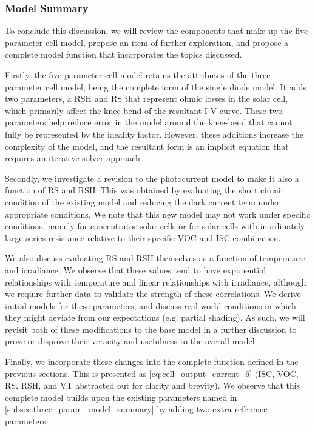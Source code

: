 \subsubsection{Model Summary}\label{subsubsec:five_param_model_summary}

To conclude this discussion, we will review the components that make up the
five parameter cell model, propose an item of further exploration, and propose a
complete model function that incorporates the topics discussed.

Firstly, the five parameter cell model retains the attributes of the three
parameter cell model, being the complete form of the single diode model. It adds
two parameters, a \acf{RSH} and \acf{RS} that represent ohmic losses in the
solar cell, which primarily affect the knee-bend of the resultant \ac{I-V}
curve. These two parameters help reduce error in the model around the knee-bend
that cannot fully be represented by the ideality factor. However, these
additions increase the complexity of the model, and the resultant form is an
implicit equation that requires an iterative solver approach.

Secondly, we investigate a revision to the photocurrent model to make it also a
function of \ac{RS} and \ac{RSH}. This was obtained by evaluating the short
circuit condition of the existing model and reducing the dark current term under
appropriate conditions. We note that this new model may not work under specific
conditions, namely for concentrator solar cells or for solar cells with
inordinately large series resistance relative to their specific \ac{VOC} and
\ac{ISC} combination.

We also discuss evaluating \ac{RS} and \ac{RSH} themselves as a function of
temperature and irradiance. We observe that these values tend to have
exponential relationships with temperature and linear relationships with
irradiance, although we require further data to validate the strength of these
correlations. We derive initial models for these parameters, and discuss real
world conditions in which they might deviate from our expectations (e.g. partial
shading). As such, we will revisit both of these modifications to the base model
in a further discussion to prove or disprove their veracity and usefulness to
the overall model.

Finally, we incorporate these changes into the complete function defined in the
previous sections. This is presented as \autoref{eq:cell_output_current_6}
(\ac{ISC}, \ac{VOC}, \ac{RS}, \ac{RSH}, and \ac{VT} abstracted out for clarity
and brevity). We observe that this complete model builds upon the existing
parameters named in \autoref{subsec:three_param_model_summary} by adding two
extra reference parameters:

